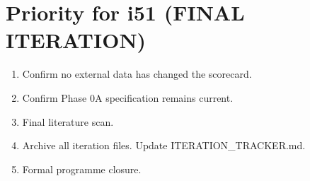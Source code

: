 \documentclass[11pt,a4paper]{article}
\begin{document}
\part{Priority for i51 (FINAL ITERATION)}

\begin{enumerate}
\item Confirm no external data has changed the scorecard.
\item Confirm Phase 0A specification remains current.
\item Final literature scan.
\item Archive all iteration files. Update ITERATION\_TRACKER.md.
\item Formal programme closure.
\end{enumerate}
\end{document}
